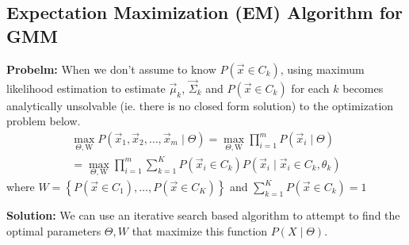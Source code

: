 \documentclass[11pt]{elegantbook}
\begin{document}
\subsection{Expectation Maximization (EM) Algorithm for GMM}
\textbf{Probelm:} When we don't assume to know $P(\vec{x}\in C_k)$, using maximum
likelihood estimation to estimate $\vec{\mu}_k$, $\vec{\Sigma}_k$ and $P(\vec{x}\in C_k)$ for each $k$ becomes analytically unsolvable (ie. there is no closed form solution) to the optimization problem below.
$$
\begin{aligned}
\max _{\Theta, \mathrm{W}} P\left(\vec{x}_1, \vec{x}_2, \ldots, \vec{x}_m \mid \Theta\right)=\max _{\Theta, \mathrm{W}} \prod_{i=1}^m P\left(\vec{x}_i \mid \Theta\right) \\
=\max _{\Theta, \mathrm{W}} \prod_{i=1}^m \sum_{k=1}^K P\left(\vec{x}_i \in C_k\right) P\left(\vec{x}_i \mid \vec{x}_i \in C_k, \theta_k\right)
\end{aligned}
$$
where $W=\left\{P\left(\vec{x} \in C_1\right), \ldots, P\left(\vec{x} \in C_K\right)\right\}$ and $\sum_{k=1}^K P\left(\vec{x} \in C_k\right)=1$

\textbf{Solution:} We can use an iterative search based algorithm to attempt to find the optimal parameters $\Theta, W$ that maximize this function $P(X \mid \Theta)$.
\end{document}
